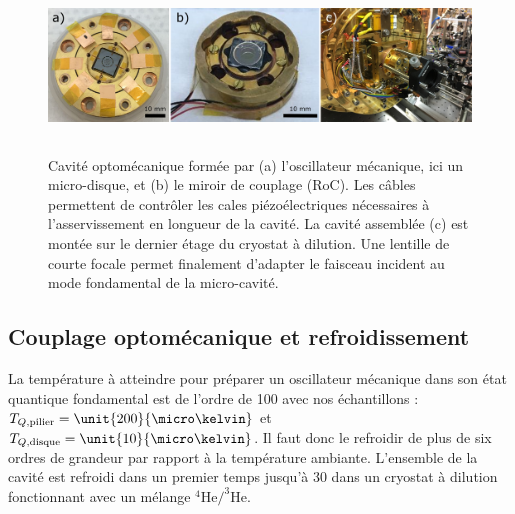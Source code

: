 \documentclass[12pt,a4paper]{article}
\newcommand{\uroc}{\micro RoC}
\begin{document}
\begin{figure}
\center
\includegraphics[height=129pt]{figures/optomechanical_cavity.png}
\caption{Cavité optomécanique formée par (a) l'oscillateur mécanique, ici un micro-disque, et (b) le miroir de couplage (\uroc).
Les câbles permettent de contrôler les cales piézoélectriques nécessaires à l'asservissement en longueur de la cavité.
La cavité assemblée (c) est montée sur le dernier étage du cryostat à dilution.
Une lentille de courte focale permet finalement d'adapter le faisceau incident au mode fondamental de la micro-cavité.}
\label{fig:cavity}
\end{figure}

\subsection{Couplage optomécanique et refroidissement}
\label{sec:optomechanics}

La température à atteindre pour préparer un oscillateur mécanique dans son état quantique fondamental est de l'ordre de \unit{100}{\micro\kelvin} avec nos échantillons : $T_{Q,\mathrm{pilier}} = \unit{200}{\micro\kelvin}$ et $T_{Q,\mathrm{disque}} = \unit{10}{\micro\kelvin}$.
Il faut donc le refroidir de plus de six ordres de grandeur par rapport à la température ambiante.
L'ensemble de la cavité est refroidi dans un premier temps jusqu'à \unit{30}{\milli\kelvin} dans un cryostat à dilution fonctionnant avec un mélange $\mathrm{^4He/^3He}$.
\end{document}
